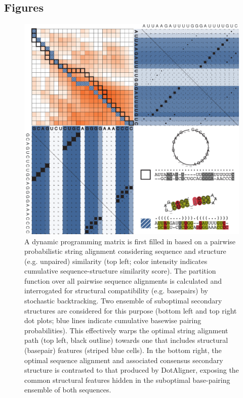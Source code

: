 \documentclass{bmcart}
\begin{document}
\begin{backmatter}


\section*{Figures}

\begin{figure}[h!]
\includegraphics[width=\textwidth]{fig1}
 \caption {
	A dynamic programming matrix is first filled in based on a pairwise
	probabilistic string alignment considering sequence and structure (e.g.
	unpaired) similarity (top left; color intensity indicates cumulative
	sequence-structure similarity score).  The partition function over all
	pairwise sequence alignments is calculated and interrogated for
	structural compatibility (e.g. basepairs) by stochastic backtracking.  Two ensemble of
	suboptimal secondary structures are considered for this purpose (bottom
	left and top right dot plots; blue lines indicate cumulative basewise
	pairing probabilities). This effectively warps the optimal
	string alignment path (top left, black outline) towards one
	that includes structural (basepair) features (striped blue
	cells). In the bottom right, the optimal sequence alignment and
	associated consensus secondary structure is contrasted to that produced
	by DotAligner, exposing the common structural features hidden in the
	suboptimal base-pairing ensemble of both sequences. 
 }
\end{figure}



\end{backmatter}
\end{document}

